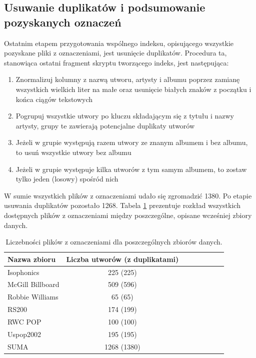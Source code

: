\subsection{Usuwanie duplikatów i podsumowanie pozyskanych oznaczeń}

Ostatnim etapem przygotowania wspólnego indeksu, opisującego wszystkie pozyskane pliki z
oznaczeniami, jest usunięcie duplikatów. Procedura ta, stanowiąca ostatni fragment skryptu
tworzącego indeks, jest następująca:

\begin{enumerate}
    \item Znormalizuj kolumny z nazwą utworu, artysty i albumu poprzez zamianę wszystkich wielkich
        liter na małe oraz usunięcie białych znaków z początku i końca ciągów tekstowych
    \item Pogrupuj wszystkie utwory po kluczu składającym się z tytułu i nazwy artysty, grupy te
        zawierają potencjalne duplikaty utworów
    \item Jeżeli w grupie występują razem utwory ze znanym albumem i bez albumu, to usuń wszystkie
        utwory bez albumu
    \item Jeżeli w grupie występuje kilka utworów z tym samym albumem, to zostaw tylko jeden
        (losowy) spośród nich
\end{enumerate}

W sumie wszystkich plików z oznaczeniami udało się zgromadzić 1380. Po etapie usuwania duplikatów
pozostało 1268. Tabela \ref{tab:datasets1} prezentuje rozkład wszystkich dostępnych plików z
oznaczeniami między poszczególne, opisane wcześniej zbiory danych.

\begin{table}
    \centering
    \caption{Liczebności plików z oznaczeniami dla poszczególnych zbiorów danych.}
    \label{tab:datasets1}
    \begin{tabular}{|l|c|c|c|c|c|c|c|} \hline
        Nazwa zbioru & Liczba utworów (z duplikatami) \\ \hline
        Isophonics & 225 (225) \\
        McGill Billboard & 509 (596) \\
        Robbie Williams & 65 (65) \\
        RS200 & 174 (199) \\
        RWC POP & 100 (100) \\
        Uspop2002 & 195 (195) \\
        SUMA & 1268 (1380) \\ \hline
    \end{tabular}
\end{table}


